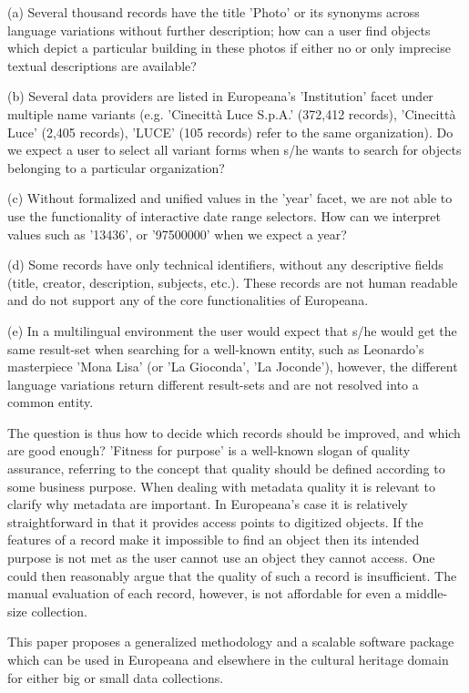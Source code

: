 (a) Several thousand records have the title 'Photo' or its synonyms across language variations without further description; how can a user find  objects which depict a particular building in these photos if either no or only imprecise textual descriptions are available?

(b) Several data providers are listed in Europeana's 'Institution' facet under multiple name variants (e.g. 'Cinecittà Luce S.p.A.' (372,412 records), 'Cinecittà Luce' (2,405 records), 'LUCE' (105 records)  refer to the same organization). Do we expect a user to select all variant forms when s/he wants to search for objects belonging to a particular organization?

(c) Without formalized and unified values in the 'year' facet, we are not able to use the functionality of interactive date range selectors. How can we interpret values such as '13436', or '97500000' when we expect a year?

(d) Some records have only technical identifiers, without any descriptive fields (title, creator, description, subjects, etc.). These records are not human readable and do not support any of the core functionalities of Europeana.

(e) In a multilingual environment the user would expect that s/he would get the same result-set when searching for a well-known entity, such as Leonardo's masterpiece 'Mona Lisa' (or 'La Gioconda', 'La Joconde'), however, the different language variations return different result-sets and are not resolved into a common entity.

The question is thus how to decide which records should be improved, and which are good enough? 'Fitness for purpose' is a well-known slogan of quality assurance, referring to the concept that quality should be defined according to some business purpose. When dealing with metadata quality it is relevant to clarify why metadata are important. In Europeana's case it is relatively straightforward in that it provides access points to digitized objects. If the features of a record make it impossible to find an object then its intended purpose is not met as the user cannot use an object they cannot access. One could then reasonably argue that the quality of such a record is insufficient. The manual evaluation of each record, however, is not affordable for even a middle-size collection.

This paper proposes a generalized methodology and a scalable software package which can be used in Europeana and elsewhere in the cultural heritage domain for either big or small data collections.

